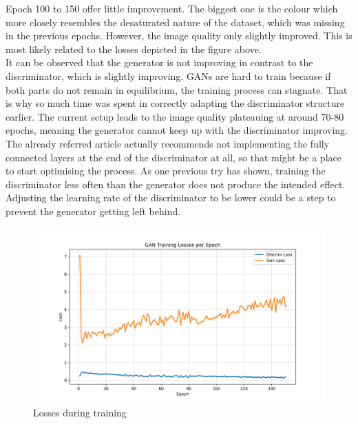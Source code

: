 Epoch 100 to 150 offer little improvement. The biggest one is the colour which more closely resembles the desaturated nature of the dataset, which was missing in the previous epochs. However, the image quality only slightly improved. This is most likely related to the losses depicted in the figure above. \\
It can be observed that the generator is not improving in contrast to the discriminator, which is slightly improving. GANs are hard to train because if both parts do not remain in equilibrium, the training process can stagnate. That is why so much time was spent in correctly adapting the discriminator structure earlier. The current setup leads to the image quality plateauing at around 70-80 epochs, meaning the generator cannot keep up with the discriminator improving. The already referred article \cite{brownlee_tips_2019} actually recommends not implementing the fully connected layers at the end of the discriminator at all, so that might be a place to start optimising the process. As one previous try has shown, training the discriminator less often than the generator does not produce the intended effect.  Adjusting the learning rate of the discriminator to be lower could be a step to prevent the generator getting left behind. 

\begin{figure}[t]
        \centering
        \includegraphics[width=\textwidth]{images/ex_2/try_2/training_losses_epoch}
        \caption{Losses during training}
    \end{figure}























 
